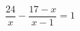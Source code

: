 \begin{ex}[type=equation]
	\begin{condition}
		$\dfrac{24}{x} - \dfrac{17 - x}{x - 1} = 1$
	\end{condition}
\end{ex}